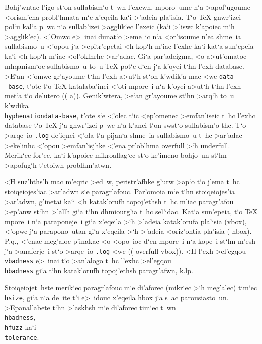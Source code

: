 Bohj'wntac l'igo st`on sullabism`o t~wn l'exewn, mporo~ume n`a
>apof'ugoume <orism'ena pro\-bl'h\-ma\-ta m`e x'eqeila ka`i >'adeia
pla'isia. T`o {\rm \TeX} gnwr'izei pol`u kal`a p~wc n`a sullab'izei
>agglik`ec l'exeic (ka`i >'iswc k'apoiec m`h >agglik'ec). <'Omwc e>~inai
dunat`o >eme~ic n`a <or'isoume n'ea shme~ia sullabismo~u <'opou j`a
>epitr'epetai <h kop`h m'iac l'exhc ka`i kat`a sun'epeia ka`i <h kop`h
m'iac <ol'oklhrhc >ar'adac. Gi`a par'adeigma, <o a>ut'omatoc
mhqanism`oc sullabismo~u to~u {\rm \TeX} pot`e d`en j`a k'oyei t`hn
l'exh {\rm database}.  >E`an <'omwc gr'ayoume t`hn l'exh a>ut`h st`on
k'wdik'a mac <wc {\tt data\\-base}, t'o\-te t`o {\rm \TeX} katalaba'inei
<'oti mpore~i n`a k'oyei a>ut`h t`hn l'exh met`a t`o de'utero (({\rm
a})).  Genik'wtera, >e`an gr'ayoume st`hn >arq`h to~u k'wdika {\tt
\\hyphenation\lb data-base\rb}, t'ote s`e <'olec t`ic <ep'omenec
>emfan'iseic t~hc l'exhc {\rm database} t`o {\rm \TeX} j`a gnwr'izei
p~wc n`a k'anei t`on swst`o sullabism'o thc. T`o >arqe~io
{\tt .log} de'iqnei <'ola t`a pijan`a shme~ia sullabismo~u t~hc >ar'adac
>eke'inhc <'opou >em\-fa\-n'i\-sjhke <'ena pr'oblhma {\rm overfull} >`h
{\rm underfull}. Merik`ec for'ec, ka`i k'apoiec mikroallag`ec st`o
ke'imeno bohjo~un st`hn >apofug`h t'etoiwn problhm'atwn.

<H suz'hths'h mac m'eqric >ed~w, peristr'afhke g'urw >ap`o t`o j'ema    
t~hc stoiqeiojes'iac >ar'adwn s`e paragr'afouc. Par'omoia m`e t`hn
stoiqeiojes'ia >ar'adwn, g'inetai ka`i <h katak'orufh topo\-j'e\-thsh
t~hc m'iac paragr'afou >ep'anw st`hn >'allh gi`a t`hn dhmiourg'ia t~hc
sel'idac.  Kat`a sun'epeia, t`o {\rm \TeX} mpore~i n`a paraponeje~i gi`a
x'eqeila >`h >'adeia katak'orufa pla'isia ({\rm vbox}), <'opwc j`a
parapono~utan gi`a x'eqeila >`h >'adeia <oriz'ontia pla'isia ({\rm
hbox}).  P.q., <'enac meg'aloc p'inakac <o <opo~ioc d`en mpore~i n`a
kope~i st`hn m'esh j`a >anaferje~i st`o >arqe~io {\tt .log} <wc (({\rm
overfull vbox})).  <H l'exh >el'egqou {\tt \\vbadness} e>~inai t`o
>an'alogo t~hc l'exhc >el'egqou {\tt \\hbadness} gi`a t`hn katak'orufh
topoj'ethsh paragr'afwn, k.lp.

\exercise Stoiqeiojet~hste merik`ec paragr'afouc m`e di'aforec (mikr`ec
>`h meg'alec) tim`ec {\tt \\hsize}, gi`a n`a de~ite t'i e>~idouc
x'eqeila {\rm hbox} j`a s~ac parousiasto~un. >Epa\-na\-l'a\-be\-te t`hn
>'askhsh m`e di'aforec tim`ec t~wn {\tt \\hbadness}, {\tt \\hfuzz} ka`i
{\tt \\tolerance}.

